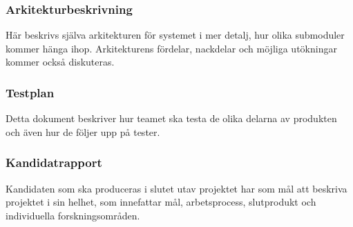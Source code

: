 \subsubsection*{Arkitekturbeskrivning}
Här beskrivs själva arkitekturen för systemet i mer detalj, hur olika submoduler kommer hänga ihop. Arkitekturens fördelar, nackdelar och möjliga utökningar kommer också diskuteras.

\subsubsection*{Testplan}
Detta dokument beskriver hur teamet ska testa de olika delarna av produkten och även hur de följer upp på tester.

\subsubsection*{Kandidatrapport}
Kandidaten som ska produceras i slutet utav projektet har som mål att beskriva projektet i
sin helhet, som innefattar mål, arbetsprocess, slutprodukt och individuella forskningsområden.

